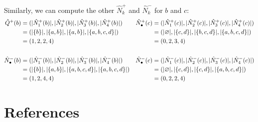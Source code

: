 \documentclass[
]{article}
\begin{document}
\begin{example}
Similarly, we can compute the other $\hat{N}_k^+$ and $\hat{N}_k^-$ for $b$ and $c$:
\begin{align*}
    \hat{Q}^+ (b) &= (\lvert \hat{N}^+_1(b)\rvert, \lvert \hat{N}^+_2(b)\rvert, \lvert \hat{N}^+_3(b)\rvert, \lvert \hat{N}^+_4(b)\rvert) &
    \hat{N}_\bullet^+ (c) &= (\lvert \hat{N}^+_1(c)\rvert, \lvert \hat{N}^+_2(c)\rvert, \lvert \hat{N}^+_3(c)\rvert, \lvert \hat{N}^+_4(c)\rvert) \\
        &= (\lvert \{b\}\rvert, \lvert \{a, b\}\rvert, \lvert \{a, b\}\rvert, \lvert \{a, b, c, d\}\rvert) &
        &= (\lvert \varnothing\rvert, \lvert \{c, d\}\rvert, \lvert \{b, c, d\}\rvert, \lvert \{a, b, c, d\}\rvert) \\
        &= (1, 2, 2, 4) &
        &= (0, 2, 3, 4) \\
        \\
    \hat{N}_\bullet^- (b) &= (\lvert \hat{N}^-_1(b)\rvert, \lvert \hat{N}^-_2(b)\rvert, \lvert \hat{N}^-_3(b)\rvert, \lvert \hat{N}^-_4(b)\rvert) &
    \hat{N}_\bullet^- (c) &= (\lvert \hat{N}^-_1(c)\rvert, \lvert \hat{N}^-_2(c)\rvert, \lvert \hat{N}^-_3(c)\rvert, \lvert \hat{N}^-_4(c)\rvert) \\
        &= (\lvert \{b\}\rvert, \lvert \{a, b\}\rvert, \lvert \{a, b, c, d\}\rvert, \lvert \{a, b, c, d\}\rvert) &
        &= (\lvert \varnothing\rvert, \lvert \{c, d\}\rvert, \lvert \{c, d\}\rvert, \lvert \{a, b, c, d\}\rvert) \\
        &= (1, 2, 4, 4) &&= (0, 2, 2, 4)
\end{align*}
\end{example}

\hypertarget{references}{%
\section{References}\label{references}}
\end{document}
